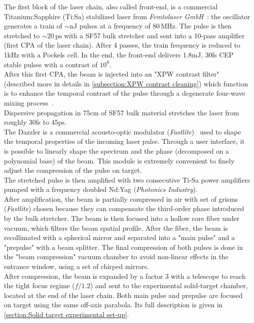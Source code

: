 \noindent {} The first block of the laser chain, also called front-end, is a commercial Titanium:Sapphire (Ti:Sa) stabilized laser from \textit{Femtolaser GmbH}~\cite{moulton1986spectroscopic}: the oscillator generates a train of  $\sim$nJ pulses at a frequency of $80\,\mathrm{MHz}$. The pulse is then stretched to $\sim 20\,\mathrm{ps}$ with a SF57 bulk stretcher and sent into a 10-pass amplifier (first CPA of the laser chain). After 4 passes, the train frequency is reduced to 1kHz with a Pockels cell. In the end, the front-end delivers 1.8mJ, 30fs CEP stable pulses with a contrast of $10^{8}$.\\
\noindent {} After this first CPA, the beam is injected into an "XPW contrast filter" (described more in details in \ref{subsection:XPW contrast cleaning}) which function is to enhance the temporal contrast of the pulse through a degenerate four-wave mixing process~\cite{jullien200510}.\\
\noindent {}
Dispersive propagation in 75cm of SF57 bulk material stretches the laser from roughly 30fs to 45ps. \\
The Dazzler is a commercial acousto-optic modulator (\textit{Fastlite})~\cite{verluise2000amplitude} used to shape the temporal properties of the incoming laser pulse. Through a user interface, it is possible to linearly shape the spectrum and the phase (decomposed on a polynomial base) of the beam. This 
module is extremely convenient to finely adjust the compression of the pulse on target.\\
\noindent {} The stretched pulse is then amplified with two consecutive Ti-Sa power amplifiers pumped with a frequency doubled Nd:Yag (\textit{Photonics Industry}).\\
  After amplification, the beam is partially compressed in air with set of grisms (\textit{Fastlite}) chosen because they can compensate the third-order phase introduced by the bulk stretcher. The beam is then focused into a hollow core fiber under vacuum, which filters the beam spatial profile. After the fiber, the beam is recollimated with a spherical mirror and separated into a "main pulse" and a "prepulse" with a beam splitter. The final compression of both pulses is done in the "beam compression" vacuum chamber to avoid non-linear effects in the entrance window, using a set of chirped mirrors. \\
   After compression, the beam is expanded by a factor 3 with a telescope to reach the tight focus regime ($f/1.2$) and sent to the experimental solid-target chamber,  located at the end of the laser chain. Both main pulse and prepulse are focused on target using the same off-axis parabola. Its full description is given in \ref{section:Solid target experimental set-up}.





